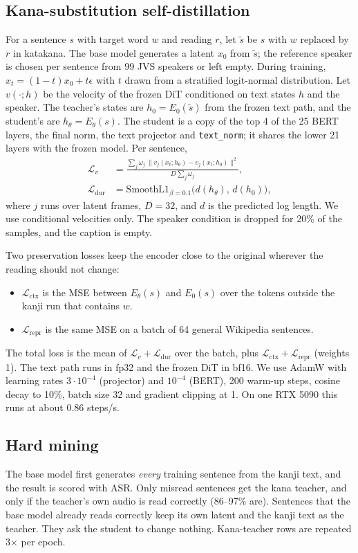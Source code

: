 \documentclass[10pt,a4paper,twocolumn]{article}
\begin{document}
\subsection{Kana-substitution self-distillation}
For a sentence $s$ with target word $w$ and reading $r$, let $\tilde s$ be $s$ with $w$
replaced by $r$ in katakana. The base model generates a latent $x_0$ from $\tilde s$; the
reference speaker is chosen per sentence from 99 JVS speakers or left empty. During training,
$x_t=(1-t)x_0+t\epsilon$ with $t$ drawn from a stratified logit-normal distribution. Let
$v(\cdot;h)$ be the velocity of the frozen DiT conditioned on text states $h$ and the speaker.
The teacher's states are $h_0=E_0(\tilde s)$ from the frozen text path, and the student's are
$h_\theta=E_\theta(s)$. The student is a copy of the top 4 of the 25 BERT layers, the final
norm, the text projector and \texttt{text\_norm}; it shares the lower 21 layers with the
frozen model. Per sentence,
\begin{align}
\mathcal{L}_v &= \frac{\sum_j \omega_j\,\lVert v_j(x_t;h_\theta)-v_j(x_t;h_0)\rVert^2}{D\sum_j\omega_j},\\
\mathcal{L}_{\mathrm{dur}} &= \mathrm{SmoothL1}_{\beta=0.1}\bigl(d(h_\theta),\,d(h_0)\bigr),
\end{align}
where $j$ runs over latent frames, $D=32$, and $d$ is the predicted log length. We use
conditional velocities only. The speaker condition is dropped for 20\% of the samples, and the
caption is empty.

Two preservation losses keep the encoder close to the original wherever the reading should
not change:
\begin{itemize}
\item $\mathcal{L}_{\mathrm{ctx}}$ is the MSE between $E_\theta(s)$ and $E_0(s)$ over the
  tokens outside the kanji run that contains $w$.
\item $\mathcal{L}_{\mathrm{repr}}$ is the same MSE on a batch of 64 general Wikipedia
  sentences.
\end{itemize}
The total loss is the mean of $\mathcal{L}_v+\mathcal{L}_{\mathrm{dur}}$ over the batch, plus
$\mathcal{L}_{\mathrm{ctx}}+\mathcal{L}_{\mathrm{repr}}$ (weights 1). The text path runs in
fp32 and the frozen DiT in bf16. We use AdamW with learning rates $3\cdot10^{-4}$ (projector)
and $10^{-4}$ (BERT), 200 warm-up steps, cosine decay to 10\%, batch size 32 and gradient
clipping at 1. On one RTX 5090 this runs at about 0.86 steps/s.

\subsection{Hard mining}
The base model first generates \emph{every} training sentence from the kanji text, and the
result is scored with ASR. Only misread sentences get the kana teacher, and only if the
teacher's own audio is read correctly (86--97\% are). Sentences that the base model already
reads correctly keep its own latent and the kanji text as the teacher. They ask the student to
change nothing. Kana-teacher rows are repeated 3$\times$ per epoch.
\end{document}
